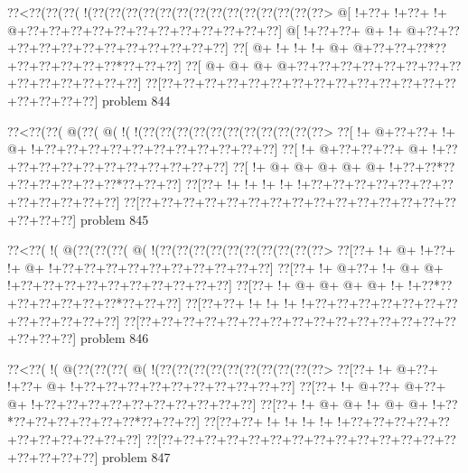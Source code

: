 \vbox{\vbox{\goo
\0??<\0??(\0??(\0??(\- !(\0??(\0??(\0??(\0??(\0??(\0??(\0??(\0??(\0??(\0??(\0??(\0??(\0??(\0??>
\- @[\- !+\0??+\- !+\0??+\- !+\- @+\0??+\0??+\0??+\0??+\0??+\0??+\0??+\0??+\0??+\0??+\0??+\0??]
\- @[\- !+\0??+\0??+\- @+\- !+\- @+\0??+\0??+\0??+\0??+\0??+\0??+\0??+\0??+\0??+\0??+\0??+\0??]
\0??[\- @+\- !+\- !+\- !+\- @+\- @+\0??+\0??+\0??*\0??+\0??+\0??+\0??+\0??+\0??*\0??+\0??+\0??]
\0??[\- @+\- @+\- @+\- @+\0??+\0??+\0??+\0??+\0??+\0??+\0??+\0??+\0??+\0??+\0??+\0??+\0??+\0??]
\0??[\0??+\0??+\0??+\0??+\0??+\0??+\0??+\0??+\0??+\0??+\0??+\0??+\0??+\0??+\0??+\0??+\0??+\0??]
}
\hfil problem 844\hfil\break
}



\vbox{\vbox{\goo
\0??<\0??(\0??(\- @(\0??(\- @(\- !(\- !(\0??(\0??(\0??(\0??(\0??(\0??(\0??(\0??(\0??(\0??(\0??>
\0??[\- !+\- @+\0??+\0??+\- !+\- @+\- !+\0??+\0??+\0??+\0??+\0??+\0??+\0??+\0??+\0??+\0??+\0??]
\0??[\- !+\- @+\0??+\0??+\0??+\- @+\- !+\0??+\0??+\0??+\0??+\0??+\0??+\0??+\0??+\0??+\0??+\0??]
\0??[\- !+\- @+\- @+\- @+\- @+\- @+\- !+\0??+\0??*\0??+\0??+\0??+\0??+\0??+\0??*\0??+\0??+\0??]
\0??[\0??+\- !+\- !+\- !+\- !+\- !+\0??+\0??+\0??+\0??+\0??+\0??+\0??+\0??+\0??+\0??+\0??+\0??]
\0??[\0??+\0??+\0??+\0??+\0??+\0??+\0??+\0??+\0??+\0??+\0??+\0??+\0??+\0??+\0??+\0??+\0??+\0??]
}
\hfil problem 845\hfil\break
}



\vbox{\vbox{\goo
\0??<\0??(\- !(\- @(\0??(\0??(\0??(\- @(\- !(\0??(\0??(\0??(\0??(\0??(\0??(\0??(\0??(\0??(\0??>
\0??[\0??+\- !+\- @+\- !+\0??+\- !+\- @+\- !+\0??+\0??+\0??+\0??+\0??+\0??+\0??+\0??+\0??+\0??]
\0??[\0??+\- !+\- @+\0??+\- !+\- @+\- @+\- !+\0??+\0??+\0??+\0??+\0??+\0??+\0??+\0??+\0??+\0??]
\0??[\0??+\- !+\- @+\- @+\- @+\- @+\- !+\- !+\0??*\0??+\0??+\0??+\0??+\0??+\0??*\0??+\0??+\0??]
\0??[\0??+\0??+\- !+\- !+\- !+\- !+\0??+\0??+\0??+\0??+\0??+\0??+\0??+\0??+\0??+\0??+\0??+\0??]
\0??[\0??+\0??+\0??+\0??+\0??+\0??+\0??+\0??+\0??+\0??+\0??+\0??+\0??+\0??+\0??+\0??+\0??+\0??]
}
\hfil problem 846\hfil\break
}



\vbox{\vbox{\goo
\0??<\0??(\- !(\- @(\0??(\0??(\0??(\- @(\- !(\0??(\0??(\0??(\0??(\0??(\0??(\0??(\0??(\0??(\0??>
\0??[\0??+\- !+\- @+\0??+\- !+\0??+\- @+\- !+\0??+\0??+\0??+\0??+\0??+\0??+\0??+\0??+\0??+\0??]
\0??[\0??+\- !+\- @+\0??+\- @+\0??+\- @+\- !+\0??+\0??+\0??+\0??+\0??+\0??+\0??+\0??+\0??+\0??]
\0??[\0??+\- !+\- @+\- @+\- !+\- @+\- @+\- !+\0??*\0??+\0??+\0??+\0??+\0??+\0??*\0??+\0??+\0??]
\0??[\0??+\0??+\- !+\- !+\- !+\- !+\- !+\0??+\0??+\0??+\0??+\0??+\0??+\0??+\0??+\0??+\0??+\0??]
\0??[\0??+\0??+\0??+\0??+\0??+\0??+\0??+\0??+\0??+\0??+\0??+\0??+\0??+\0??+\0??+\0??+\0??+\0??]
}
\hfil problem 847\hfil\break
}



